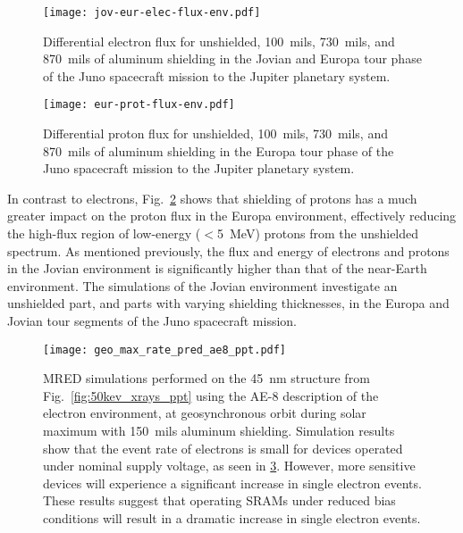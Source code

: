 \begin{figure}[htbp]
    \begin{center}
        \texttt{[image: jov-eur-elec-flux-env.pdf]}
    \end{center}
    \caption{Differential electron flux for unshielded, 100~mils, 730~mils, and 870~mils of aluminum shielding in the Jovian and Europa tour phase of the Juno spacecraft mission to the Jupiter planetary system.}
    \label{fig:jov-eur-elec-flux-env}
\end{figure}

\begin{figure}[htbp]
    \begin{center}
        \texttt{[image: eur-prot-flux-env.pdf]}
    \end{center}
    \caption{Differential proton flux for unshielded, 100~mils, 730~mils, and 870~mils of aluminum shielding in the Europa tour phase of the Juno spacecraft mission to the Jupiter planetary system.}
    \label{fig:eur-prot-flux-env}
\end{figure}

In contrast to electrons, Fig.~\ref{fig:eur-prot-flux-env} shows that shielding of protons has a much greater impact on the proton flux in the Europa environment, effectively reducing the high-flux region of low-energy ($<$5~MeV) protons from the unshielded spectrum.
As mentioned previously, the flux and energy of electrons and protons in the Jovian environment is significantly higher than that of the near-Earth environment.
The simulations of the Jovian environment investigate an unshielded part, and parts with varying shielding thicknesses, in the Europa and Jovian tour segments of the Juno spacecraft mission.

\begin{figure}[htbp]
    \begin{center}
        \texttt{[image: geo\_max\_rate\_pred\_ae8\_ppt.pdf]}
    \end{center}
    \caption{MRED simulations performed on the 45~nm structure from Fig.~\ref{fig:50kev_xrays_ppt} using the AE-8 description of the electron environment, at geosynchronous orbit during solar maximum with 150~mils aluminum shielding. Simulation results show that the event rate of electrons is small for devices operated under nominal supply voltage, as seen in \ref{fig:geo_max_rate_pred_ae8_ppt}. However, more sensitive devices will experience a significant increase in single electron events. These results suggest that operating SRAMs under reduced bias conditions will result in a dramatic increase in single electron events.}
    \label{fig:geo_max_rate_pred_ae8_ppt}
\end{figure}

